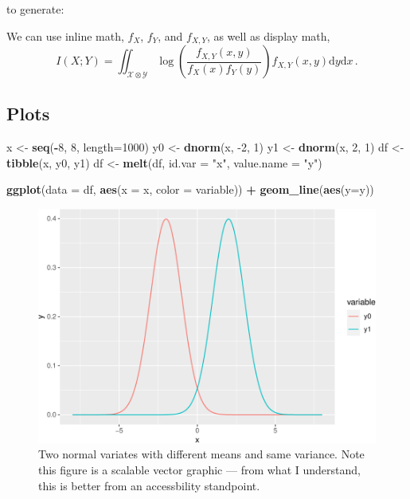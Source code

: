 \documentclass[
]{article}
\newenvironment{Shaded}{\begin{snugshade}}{\end{snugshade}}
\newcommand{\DataTypeTok}[1]{\textcolor[rgb]{0.13,0.29,0.53}{#1}}
\newcommand{\DecValTok}[1]{\textcolor[rgb]{0.00,0.00,0.81}{#1}}
\newcommand{\KeywordTok}[1]{\textcolor[rgb]{0.13,0.29,0.53}{\textbf{#1}}}
\newcommand{\NormalTok}[1]{#1}
\newcommand{\OperatorTok}[1]{\textcolor[rgb]{0.81,0.36,0.00}{\textbf{#1}}}
\newcommand{\StringTok}[1]{\textcolor[rgb]{0.31,0.60,0.02}{#1}}
\begin{document}
to generate:

We can use inline math, \(f_X\), \(f_Y\), and \(f_{X,Y}\), as well as display math,
\[
  I(X;Y)
  = \iint_{\mathcal{X} \otimes \mathcal{Y}}
  \log\left( \frac{f_{X,Y}(x,y)}{f_{X}(x)f_{Y}(y)} \right)
  f_{X,Y}(x,y) \mathrm{d}y \mathrm{d}x\,.
\]

\hypertarget{plots}{%
\subsection*{Plots}\label{plots}}

\begin{Shaded}
\begin{Highlighting}[]
\NormalTok{x \textless{}{-}}\StringTok{ }\KeywordTok{seq}\NormalTok{(}\OperatorTok{{-}}\DecValTok{8}\NormalTok{, }\DecValTok{8}\NormalTok{, }\DataTypeTok{length=}\DecValTok{1000}\NormalTok{)}
\NormalTok{y0 \textless{}{-}}\StringTok{ }\KeywordTok{dnorm}\NormalTok{(x, }\DecValTok{{-}2}\NormalTok{, }\DecValTok{1}\NormalTok{)}
\NormalTok{y1 \textless{}{-}}\StringTok{ }\KeywordTok{dnorm}\NormalTok{(x, }\DecValTok{2}\NormalTok{, }\DecValTok{1}\NormalTok{)}
\NormalTok{df \textless{}{-}}\StringTok{ }\KeywordTok{tibble}\NormalTok{(x, y0, y1)}
\NormalTok{df \textless{}{-}}\StringTok{ }\KeywordTok{melt}\NormalTok{(df, }\DataTypeTok{id.var =} \StringTok{"x"}\NormalTok{, }\DataTypeTok{value.name =} \StringTok{"y"}\NormalTok{)}

\KeywordTok{ggplot}\NormalTok{(}\DataTypeTok{data =}\NormalTok{ df, }\KeywordTok{aes}\NormalTok{(}\DataTypeTok{x =}\NormalTok{ x, }\DataTypeTok{color =}\NormalTok{ variable)) }\OperatorTok{+}\StringTok{ }\KeywordTok{geom\_line}\NormalTok{(}\KeywordTok{aes}\NormalTok{(}\DataTypeTok{y=}\NormalTok{y)) }
\end{Highlighting}
\end{Shaded}

\begin{figure}
\centering
\includegraphics{_main_files/figure-latex/normals-same-var-1.pdf}
\caption{\label{fig:normals-same-var}Two normal variates with different means and same variance. Note this figure is a scalable vector graphic --- from what I understand, this is better from an accessbility standpoint.}
\end{figure}
\end{document}
